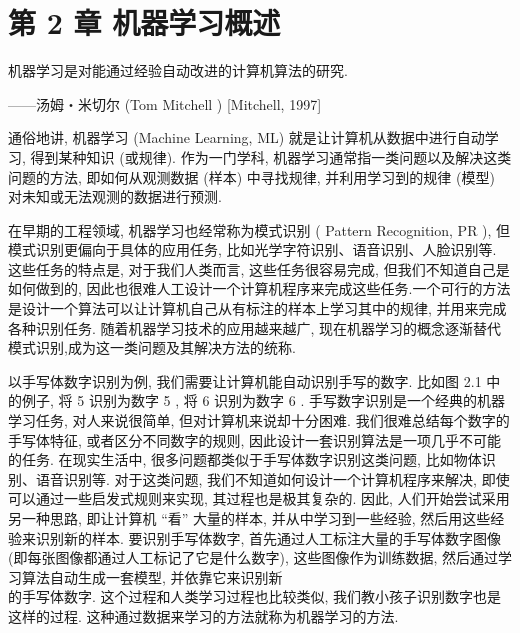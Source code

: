 \documentclass[10pt]{article}
\begin{document}
\section*{第 2 章 机器学习概述}
机器学习是对能通过经验自动改进的计算机算法的研究.

——汤姆・米切尔 (Tom Mitchell ) [Mitchell, 1997]

通俗地讲, 机器学习 (Machine Learning, ML) 就是让计算机从数据中进行自动学习, 得到某种知识 (或规律). 作为一门学科, 机器学习通常指一类问题以及解决这类问题的方法, 即如何从观测数据 (样本) 中寻找规律, 并利用学习到的规律 (模型) 对未知或无法观测的数据进行预测.

在早期的工程领域, 机器学习也经常称为模式识别 ( Pattern Recognition, PR ), 但模式识别更偏向于具体的应用任务, 比如光学字符识别、语音识别、人脸识别等. 这些任务的特点是, 对于我们人类而言, 这些任务很容易完成, 但我们不知道自己是如何做到的, 因此也很难人工设计一个计算机程序来完成这些任务.一个可行的方法是设计一个算法可以让计算机自己从有标注的样本上学习其中的规律, 并用来完成各种识别任务. 随着机器学习技术的应用越来越广, 现在机器学习的概念逐渐替代模式识别,成为这一类问题及其解决方法的统称.

以手写体数字识别为例, 我们需要让计算机能自动识别手写的数字. 比如图 2.1 中的例子, 将 5 识别为数字 5 , 将 6 识别为数字 6 . 手写数字识别是一个经典的机器学习任务, 对人来说很简单, 但对计算机来说却十分困难. 我们很难总结每个数字的手写体特征, 或者区分不同数字的规则, 因此设计一套识别算法是一项几乎不可能的任务. 在现实生活中, 很多问题都类似于手写体数字识别这类问题, 比如物体识别、语音识别等. 对于这类问题, 我们不知道如何设计一个计算机程序来解决, 即使可以通过一些启发式规则来实现, 其过程也是极其复杂的. 因此, 人们开始尝试采用另一种思路, 即让计算机 “看” 大量的样本, 并从中学习到一些经验, 然后用这些经验来识别新的样本. 要识别手写体数字, 首先通过人工标注大量的手写体数字图像 (即每张图像都通过人工标记了它是什么数字), 这些图像作为训练数据, 然后通过学习算法自动生成一套模型, 并依靠它来识别新\\
的手写体数字. 这个过程和人类学习过程也比较类似, 我们教小孩子识别数字也是这样的过程. 这种通过数据来学习的方法就称为机器学习的方法.
\end{document}
